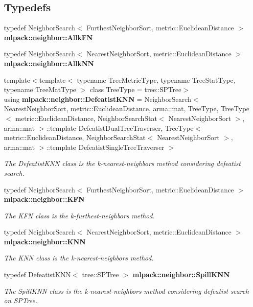 \subsection*{Typedefs}
\begin{DoxyCompactItemize}
\item 
typedef Neighbor\+Search$<$ Furthest\+Neighbor\+Sort, metric\+::\+Euclidean\+Distance $>$ {\bf mlpack\+::neighbor\+::\+Allk\+FN}
\item 
typedef Neighbor\+Search$<$ Nearest\+Neighbor\+Sort, metric\+::\+Euclidean\+Distance $>$ {\bf mlpack\+::neighbor\+::\+Allk\+NN}
\item 
{\footnotesize template$<$template$<$ typename Tree\+Metric\+Type, typename Tree\+Stat\+Type, typename Tree\+Mat\+Type $>$ class Tree\+Type = tree\+::\+S\+P\+Tree$>$ }\\using {\bf mlpack\+::neighbor\+::\+Defeatist\+K\+NN} = Neighbor\+Search$<$ Nearest\+Neighbor\+Sort, metric\+::\+Euclidean\+Distance, arma\+::mat, Tree\+Type, Tree\+Type$<$ metric\+::\+Euclidean\+Distance, Neighbor\+Search\+Stat$<$ Nearest\+Neighbor\+Sort $>$, arma\+::mat $>$\+::template Defeatist\+Dual\+Tree\+Traverser, Tree\+Type$<$ metric\+::\+Euclidean\+Distance, Neighbor\+Search\+Stat$<$ Nearest\+Neighbor\+Sort $>$, arma\+::mat $>$\+::template Defeatist\+Single\+Tree\+Traverser $>$
\begin{DoxyCompactList}\small\item\em The Defeatist\+K\+NN class is the k-\/nearest-\/neighbors method considering defeatist search. \end{DoxyCompactList}\item 
typedef Neighbor\+Search$<$ Furthest\+Neighbor\+Sort, metric\+::\+Euclidean\+Distance $>$ {\bf mlpack\+::neighbor\+::\+K\+FN}
\begin{DoxyCompactList}\small\item\em The K\+FN class is the k-\/furthest-\/neighbors method. \end{DoxyCompactList}\item 
typedef Neighbor\+Search$<$ Nearest\+Neighbor\+Sort, metric\+::\+Euclidean\+Distance $>$ {\bf mlpack\+::neighbor\+::\+K\+NN}
\begin{DoxyCompactList}\small\item\em The K\+NN class is the k-\/nearest-\/neighbors method. \end{DoxyCompactList}\item 
typedef Defeatist\+K\+NN$<$ tree\+::\+S\+P\+Tree $>$ {\bf mlpack\+::neighbor\+::\+Spill\+K\+NN}
\begin{DoxyCompactList}\small\item\em The Spill\+K\+NN class is the k-\/nearest-\/neighbors method considering defeatist search on S\+P\+Tree. \end{DoxyCompactList}\end{DoxyCompactItemize}
